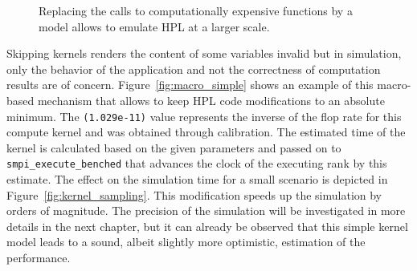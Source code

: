             \begin{figure}[htb]
                \centering
                \caption{Replacing the calls to computationally expensive functions by a model allows to emulate HPL at
                a larger scale.}
            \end{figure}

            Skipping kernels renders the content of some variables invalid but in simulation, only the behavior of the
            application and not the correctness of computation results are of concern.  Figure~\ref{fig:macro_simple} shows
            an example of this macro-based mechanism that allows to keep HPL code modifications to an absolute minimum. The
            \texttt{(1.029e-11)} value represents the inverse of the flop rate for this compute kernel and was obtained
            through calibration. The estimated time of the kernel is calculated based on the given parameters and passed on
            to \texttt{smpi\_execute\_benched} that advances the clock of the executing rank by this estimate.  The effect
            on the simulation time for a small scenario is depicted in Figure~\ref{fig:kernel_sampling}. This modification
            speeds up the simulation by orders of magnitude. The precision of the simulation will be investigated in more
            details in the next chapter, but it can already be observed that this simple kernel model leads to a sound,
            albeit slightly more optimistic, estimation of the performance.

